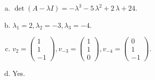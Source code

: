 \begin{questions}
\begin{solution}
\begin{enumerate}[(a)]
\item $\det(A-\lambda I)=-{\lambda}^{3} - 5 \, {\lambda}^{2} + 2 \, {\lambda} + 24$.
\item ${\lambda}_1=2, {\lambda}_2=-3, {\lambda}_3=-4$.
\item $v_{2}=\left(\begin{array}{r}
1 \\
1 \\
-1
\end{array}\right), v_{-3}=\left(\begin{array}{r}
1 \\
1 \\
0
\end{array}\right), v_{-4}=\left(\begin{array}{r}
0 \\
1 \\
-1
\end{array}\right)$.
\item Yes.
\end{enumerate}
\end{solution}

\end{questions}

\newpage


\begin{center}
\end{center}

